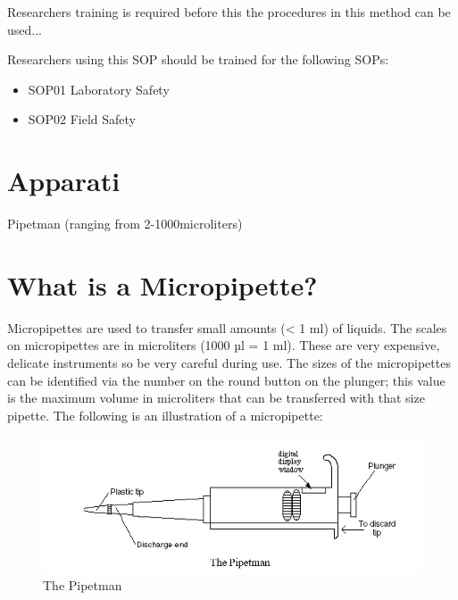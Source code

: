 \documentclass[12pt]{../SOP3_alpha}
\begin{document}
\NP Researchers training is required before this the procedures in this method can be used... 

\NP Researchers using this SOP should be trained for the following SOPs:

\begin{itemize}
  \item SOP01 Laboratory Safety
  \item SOP02 Field Safety
\end{itemize} 

\section{Apparati}

\NP Pipetman (ranging from 2-1000microliters)
\section {What is a Micropipette?}
Micropipettes are used to transfer small amounts (< 1 ml) of liquids. The scales on micropipettes are in microliters (1000 µl = 1 ml). These are very expensive, delicate instruments so be very careful during use. The sizes of the micropipettes can be identified via the number on the round button on the plunger; this value is the maximum volume in microliters that can be transferred with that size pipette. The following is an illustration of a micropipette:
\begin{figure} [H!]
\caption{The Pipetman}
\includegraphics{pipetman.jpg}
\end{figure}
\end{document}
